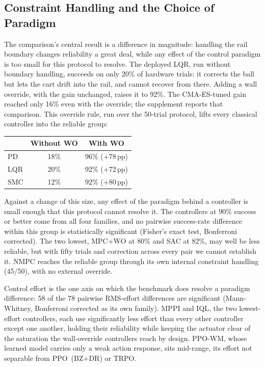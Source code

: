 \subsection{Constraint Handling and the Choice of Paradigm}

The comparison's central result is a difference in magnitude: handling the rail boundary changes reliability a great deal, while any effect of the control paradigm is too small for this protocol to resolve.
The deployed LQR, run without boundary handling, succeeds on only 20\% of hardware trials: it corrects the ball but lets the cart drift into the rail, and cannot recover from there.
Adding a wall override, with the gain unchanged, raises it to 92\%.
The CMA-ES-tuned gain reached only 16\% even with the override; the supplement reports that comparison.
This override rule, run over the 50-trial protocol, lifts every classical controller into the reliable group:

\begin{center}
\begin{tabular}{lcc}
\toprule
 & Without WO & With WO \\
\midrule
PD & 18\% & 96\% (+78\,pp) \\
LQR & 20\% & 92\% (+72\,pp) \\
SMC & 12\% & 92\% (+80\,pp) \\
\bottomrule
\end{tabular}
\end{center}

Against a change of this size, any effect of the paradigm behind a controller is small enough that this protocol cannot resolve it.
The controllers at 90\% success or better come from all four families, and no pairwise success-rate difference within this group is statistically significant (Fisher's exact test, Bonferroni corrected).
The two lowest, MPC+WO at 80\% and SAC at 82\%, may well be less reliable, but with fifty trials and correction across every pair we cannot establish it.
NMPC reaches the reliable group through its own internal constraint handling (45/50), with no external override.

Control effort is the one axis on which the benchmark does resolve a paradigm difference: 58 of the 78 pairwise RMS-effort differences are significant (Mann-Whitney, Bonferroni corrected as its own family).
MPPI and IQL, the two lowest-effort controllers, each use significantly less effort than every other controller except one another, holding their reliability while keeping the actuator clear of the saturation the wall-override controllers reach by design.
PPO-WM, whose learned model carries only a weak action response, sits mid-range, its effort not separable from PPO~(BZ+DR) or TRPO.

